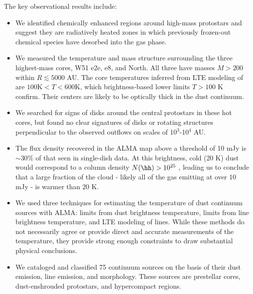 \documentclass[twocolumn]{aastex61}
\begin{document}
The key observational results include:
\begin{itemize}
    \item We identified chemically enhanced regions around high-mass protostars
        and suggest they are radiatively heated zones in which previously
        frozen-out chemical species have desorbed into the gas phase.
    \item We measured the temperature and mass structure surrounding the three
        highest-mass cores, W51 e2e, e8, and North.  All three have masses
        $M>200$ \msun within $R\lesssim5000$ AU.  The core temperatures
        inferred from LTE modeling of \methanol are $100 \mathrm{K} < T < 600
        \mathrm{K}$, which brightness-based lower limits $T>100$ K confirm.
        Their centers are likely to be optically thick in the dust continuum.
    \item We searched for signs of disks around the central protostars in these
        hot cores, but found no clear signatures of disks or rotating
        structures perpendicular to the observed outflows on scales of
        10$^3$-10$^4$ AU.
    \item The flux density recovered in the ALMA map above a threshold of 10
        mJy \perbeam is $\sim30\%$ of that seen in single-dish data.  At this
        brightness, cold (20 K) dust would correspond to a column density
        $N(\hh)>10^{25}$ \persc, leading us to conclude that a large fraction
        of the cloud - likely all of the gas emitting at over 10 mJy \perbeam -
        is warmer than 20 K.
    \item We used three techniques for estimating the temperature of
        dust continuum sources with ALMA: limits from dust brightness
        temperature, limits from line brightness temperature, and LTE modeling
        of \methanol lines.  While these methods do not necessarily agree
        or provide direct and accurate measurements of the temperature, they
        provide strong enough constraints to draw substantial physical conclusions.
    \item We cataloged and classified 75 continuum sources on the basis of their
        dust emission, line emission, and morphology.  These sources are
        prestellar cores, dust-enshrouded protostars, and hypercompact \hii
        regions.
\end{itemize}
\end{document}
